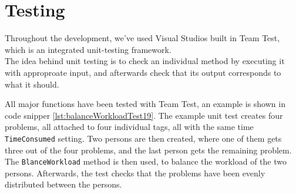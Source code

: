\chapter{Testing}
\label{chap:testing}

Throughout the development, we've used Visual Studios built in Team Test, which is an integrated unit-testing framework. \cite{teamtest} \\
The idea behind unit testing is to check an individual method by executing it with approproate input, and afterwards check that its output corresponds to what it should.

All major functions have been tested with Team Test, an example is shown in code snipper \ref{lst:balanceWorkloadTest19}. The example unit test creates four problems, all attached to four individual tags, all with the same time \verb+TimeConsumed+ setting. Two persons are then created, where one of them gets three out of the four problems, and the last person gets the remaining problem. The \verb+BlanceWorkload+ method is then used, to balance the workload of the two persons. Afterwards, the test checks that the problems have been evenly distributed between the persons.



